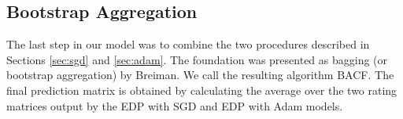 \subsection{Bootstrap Aggregation}\label{sec:bagging}

The last step in our model was to combine the two procedures described in Sections \ref{sec:sgd} and \ref{sec:adam}. The foundation was presented as bagging (or bootstrap aggregation) by Breiman\cite{breiman}. We call the resulting algorithm \ac{BACF}. The final prediction matrix is obtained by calculating the average over the two rating matrices output by the \ac{EDP} with \ac{SGD} and \ac{EDP} with Adam models.